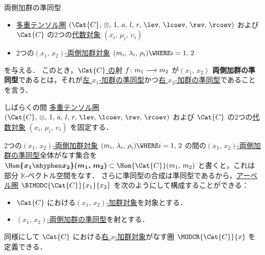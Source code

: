 \documentclass[TQFT_main]{subfiles}
\begin{document}
\begin{mydef}[label=def:hom-bimod]{両側加群の準同型}
    \begin{itemize}
        \item \hyperref[def:tensorfusion-cat]{多重テンソル圏} $(\Cat{C},\, \otimes,\, 1,\, a,\, l,\, r,\, \lev,\, \lcoev,\, \rev,\, \rcoev)$ 
        および $\Cat{C}$ の2つの\hyperref[def:algobj]{代数対象} $(x_i,\, \mu_i,\, \upsilon_i)$
        \item 2つの\hyperref[def:bimodobj]{$(x_1,\, x_2)$-両側加群対象} $(m_i,\, \lambda_i,\, \rho_i) \WHERE i = 1,\, 2$
    \end{itemize}
    を与える．
    このとき，\underline{$\Cat{C}$ の}射 $ f \colon m_1 \longrightarrow m_2$ が\textbf{$(x_1,\, x_2)$ 両側加群の準同型}であるとは，それが\hyperref[def:hom-algmod]{左 $x_1$-加群の準同型}かつ\hyperref[def:hom-algmod]{右 $x_2$-加群の準同型}であることを言う．
\end{mydef}

しばらくの間 \hyperref[def:tensorfusion-cat]{多重テンソル圏} $(\Cat{C},\, \otimes,\, 1,\, a,\, l,\, r,\, \lev,\, \lcoev,\, \rev,\, \rcoev)$ および $\Cat{C}$ の2つの\hyperref[def:algobj]{代数対象} $(x_i,\, \mu_i,\, \upsilon_i)$ を固定する．

2つの\hyperref[def:bimodobj]{$(x_1,\, x_2)$-両側加群対象} $(m_i,\, \lambda_i,\, \rho_i) \WHERE i = 1,\, 2$ の間の\hyperref[def:hom-bimod]{$(x_1,\, x_2)$-両側加群の準同型}全体がなす集合を $\bm{\Hom{x_1 \mhyphen x_2}(m_1,\, m_2)} \subset \Hom{\Cat{C}} (m_1,\, m_2)$ と書くと，これは部分 $\mathbb{K}$-ベクトル空間をなす．
さらに準同型の合成は準同型であるから，\hyperref[def:additive-cat]{アーベル圏} $\BIMODC{\Cat{C}}{x_1}{x_2}$ を次のようにして構成することができる：
\begin{itemize}
    \item $\Cat{C}$ における\hyperref[def:bimodobj]{$(x_1,\, x_2)$-加群対象}を対象とする．
    \item \hyperref[def:hom-bimod]{$(x_1,\, x_2)$-両側加群の準同型}を射とする．
\end{itemize}
同様にして $\Cat{C}$ における\hyperref[def:moduleobj]{右 $x$-加群対象}がなす圏 $\MODCR{\Cat{C}}{x}$ を定義できる．
\end{document}
